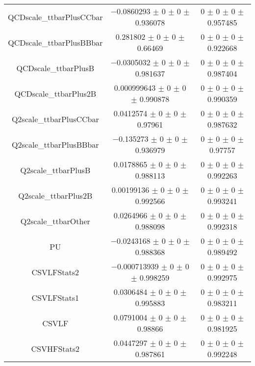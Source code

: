\begin{table}
\begin{tabular}{ccc}
QCDscale\_ttbarPlusCCbar & \num{-0.0860293} $\pm$ \num{0} $\pm$ \num{0} $\pm$ \num{0.936078} & \num{0} $\pm$ \num{0} $\pm$ \num{0} $\pm$ \num{0.957485}\\
QCDscale\_ttbarPlusBBbar & \num{0.281802} $\pm$ \num{0} $\pm$ \num{0} $\pm$ \num{0.66469} & \num{0} $\pm$ \num{0} $\pm$ \num{0} $\pm$ \num{0.922668}\\
QCDscale\_ttbarPlusB & \num{-0.0305032} $\pm$ \num{0} $\pm$ \num{0} $\pm$ \num{0.981637} & \num{0} $\pm$ \num{0} $\pm$ \num{0} $\pm$ \num{0.987404}\\
QCDscale\_ttbarPlus2B & \num{0.000999643} $\pm$ \num{0} $\pm$ \num{0} $\pm$ \num{0.990878} & \num{0} $\pm$ \num{0} $\pm$ \num{0} $\pm$ \num{0.990359}\\
Q2scale\_ttbarPlusCCbar & \num{0.0412574} $\pm$ \num{0} $\pm$ \num{0} $\pm$ \num{0.97961} & \num{0} $\pm$ \num{0} $\pm$ \num{0} $\pm$ \num{0.987632}\\
Q2scale\_ttbarPlusBBbar & \num{-0.135273} $\pm$ \num{0} $\pm$ \num{0} $\pm$ \num{0.936979} & \num{0} $\pm$ \num{0} $\pm$ \num{0} $\pm$ \num{0.97757}\\
Q2scale\_ttbarPlusB & \num{0.0178865} $\pm$ \num{0} $\pm$ \num{0} $\pm$ \num{0.988113} & \num{0} $\pm$ \num{0} $\pm$ \num{0} $\pm$ \num{0.992263}\\
Q2scale\_ttbarPlus2B & \num{0.00199136} $\pm$ \num{0} $\pm$ \num{0} $\pm$ \num{0.992566} & \num{0} $\pm$ \num{0} $\pm$ \num{0} $\pm$ \num{0.993241}\\
Q2scale\_ttbarOther & \num{0.0264966} $\pm$ \num{0} $\pm$ \num{0} $\pm$ \num{0.988098} & \num{0} $\pm$ \num{0} $\pm$ \num{0} $\pm$ \num{0.992318}\\
PU & \num{-0.0243168} $\pm$ \num{0} $\pm$ \num{0} $\pm$ \num{0.988368} & \num{0} $\pm$ \num{0} $\pm$ \num{0} $\pm$ \num{0.989492}\\
CSVLFStats2 & \num{-0.000713939} $\pm$ \num{0} $\pm$ \num{0} $\pm$ \num{0.998259} & \num{0} $\pm$ \num{0} $\pm$ \num{0} $\pm$ \num{0.992975}\\
CSVLFStats1 & \num{0.0306484} $\pm$ \num{0} $\pm$ \num{0} $\pm$ \num{0.995883} & \num{0} $\pm$ \num{0} $\pm$ \num{0} $\pm$ \num{0.983211}\\
CSVLF & \num{0.0791004} $\pm$ \num{0} $\pm$ \num{0} $\pm$ \num{0.98866} & \num{0} $\pm$ \num{0} $\pm$ \num{0} $\pm$ \num{0.981925}\\
CSVHFStats2 & \num{0.0447297} $\pm$ \num{0} $\pm$ \num{0} $\pm$ \num{0.987861} & \num{0} $\pm$ \num{0} $\pm$ \num{0} $\pm$ \num{0.992248}\\

\end{tabular}
\end{table}
